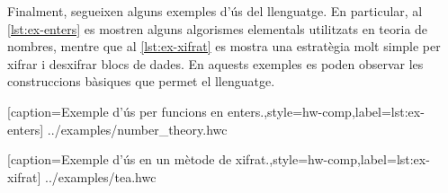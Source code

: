 Finalment, segueixen alguns exemples d'ús del llenguatge. En particular, al 
\autoref{lst:ex-enters} es mostren alguns algorismes elementals utilitzats en 
teoria de nombres, mentre que al \autoref{lst:ex-xifrat} es mostra una 
estratègia molt simple per xifrar i desxifrar blocs de dades. En aquests 
exemples es poden observar les construccions bàsiques que permet el llenguatge.

%
  [caption={Exemple d'ús per funcions en enters.},style=hw-comp,label={lst:ex-enters}]%
  {../examples/number_theory.hwc}

%
  [caption={Exemple d'ús en un mètode de xifrat.},style=hw-comp,label={lst:ex-xifrat}]%
  {../examples/tea.hwc}


